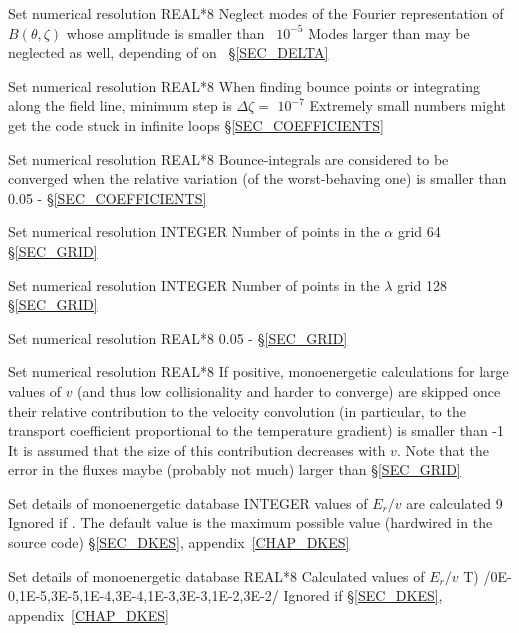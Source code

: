{Set numerical resolution}
{REAL*8}
{Neglect modes of the Fourier representation of $B(\theta,\zeta)$ whose amplitude is smaller than~}
{$10^{-5}$}
{Modes larger than  may be neglected as well, depending of on~}
{\S\ref{SEC_DELTA}}

{Set numerical resolution}
{REAL*8}
{When finding bounce points or integrating along the field line, minimum step is $\Delta\zeta=$}
{$10^{-7}$}
{Extremely small numbers might get the code stuck in infinite loops}
{\S\ref{SEC_COEFFICIENTS}}

{Set numerical resolution}
{REAL*8}
{Bounce-integrals are considered to be converged when the relative variation (of the worst-behaving one) is smaller than }
{0.05}
{-}
{\S\ref{SEC_COEFFICIENTS}}

{Set numerical resolution}
{INTEGER}
{Number of points in the $\alpha$ grid}
{64}
{}
{\S\ref{SEC_GRID}}

{Set numerical resolution}
{INTEGER}
{Number of points in the $\lambda$ grid}
{128}
{}
{\S\ref{SEC_GRID}}

{Set numerical resolution}
{REAL*8}
{}
{0.05}
{-}
{\S\ref{SEC_GRID}}

{Set numerical resolution}
{REAL*8}
If positive, monoenergetic calculations for large values of $v$ (and thus low collisionality and harder to converge) are skipped once their relative contribution to the velocity convolution (in particular, to the transport coefficient proportional to the temperature gradient) is smaller than 
{-1}
{It is assumed that the size of this contribution decreases with $v$. Note that the error in the fluxes maybe (probably not much) larger than }
{\S\ref{SEC_GRID}}

{Set details of monoenergetic database}
{INTEGER}
{ values of $E_r/v$ are calculated}
{9}%
{Ignored if \notf{}. The default value is the maximum possible value (hardwired in the source code)}
{\S\ref{SEC_DKES}, appendix~\ref{CHAP_DKES}}

{Set details of monoenergetic database}
{REAL*8}
{Calculated values of $E_r/v$ T)}
{/0E-0,1E-5,3E-5,1E-4,3E-4,1E-3,3E-3,1E-2,3E-2/}%
{Ignored if \notf{}}
{\S\ref{SEC_DKES}, appendix~\ref{CHAP_DKES}}

